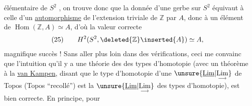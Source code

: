 élémentaire de $S^2$ , on trouve donc
que la donnée d'une gerbe sur $S^2$ équivaut
à celle d'un \uline{automorphisme} de
l'extension triviale  de $\mathbb Z$ par $A$,
donc à un élément de $\operatorname{Hom}(\mathbb Z,A)\simeq A$,
d'où la valeur correcte
\[
(25)\qquad H^2(S^2,\deleted{\mathbb Z}\inserted{A})\simeq A,
\]
magnifique succès ! Sans aller plus
loin dans des vérifications, ceci me
convainc que l'intuition qu'il y
a une théorie des 
des types d'homotopie (avec un
théorème à la \uline{van Kampen}, disant
que le type d'homotopie d'une
$\unsure{\underline{\mathrm{Lim}}|\underset{\longrightarrow}{\mathrm{Lim}}}$ de Topos (Topos ``recollé'') est
la $\unsure{\underline{\mathrm{Lim}}|\underset{\longrightarrow}{\mathrm{Lim}}}$ des types d'homotopie),
est bien correcte. En principe, pour
